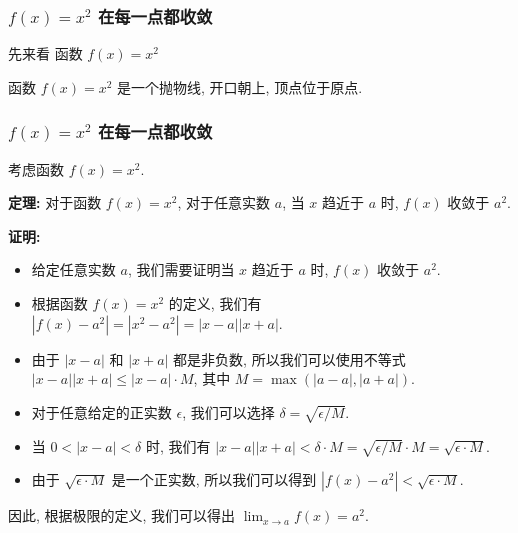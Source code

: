 \documentclass[
10pt, 
aspectratio=43, 
]{beamer}
\begin{document}
\begin{frame}
\frametitle{$f(x) = x^2$ 在每一点都收敛}
先来看 函数 $f(x) = x^2$
\begin{center}
\end{center}

函数 $f(x) = x^2$ 是一个抛物线, 开口朝上, 顶点位于原点. 

\end{frame}


\begin{frame}
\frametitle{$f(x) = x^2$ 在每一点都收敛}

考虑函数 $f(x) = x^2$. 

\pause

\textbf{定理: } 对于函数 $f(x) = x^2$, 对于任意实数 $a$, 当 $x$ 趋近于 $a$ 时, $f(x)$ 收敛于 $a^2$. 

\pause

\textbf{证明: } 
\begin{itemize}
\item 给定任意实数 $a$, 我们需要证明当 $x$ 趋近于 $a$ 时, $f(x)$ 收敛于 $a^2$. 

\pause

\item 根据函数 $f(x) = x^2$ 的定义, 我们有 $|f(x) - a^2| = |x^2 - a^2| = |x-a||x+a|$. 

\pause

\item 由于 $|x-a|$ 和 $|x+a|$ 都是非负数, 所以我们可以使用不等式 $|x-a||x+a| \leq |x-a|\cdot M$, 其中 $M = \max(|a-a|,  |a+a|)$. 

\pause

\item 对于任意给定的正实数 $\epsilon$, 我们可以选择 $\delta = \sqrt{\epsilon/M}$. 

\pause

\item 当 $0 < |x-a| < \delta$ 时, 我们有 $|x-a||x+a| < \delta \cdot M = \sqrt{\epsilon/M} \cdot M = \sqrt{\epsilon \cdot M}$. 

\pause

\item 由于 $\sqrt{\epsilon \cdot M}$ 是一个正实数, 所以我们可以得到 $|f(x) - a^2| < \sqrt{\epsilon \cdot M}$. 


\end{itemize}
\pause
因此, 根据极限的定义, 我们可以得出 $\lim_{x \to a} f(x) = a^2$. 

\end{frame}
\end{document}
